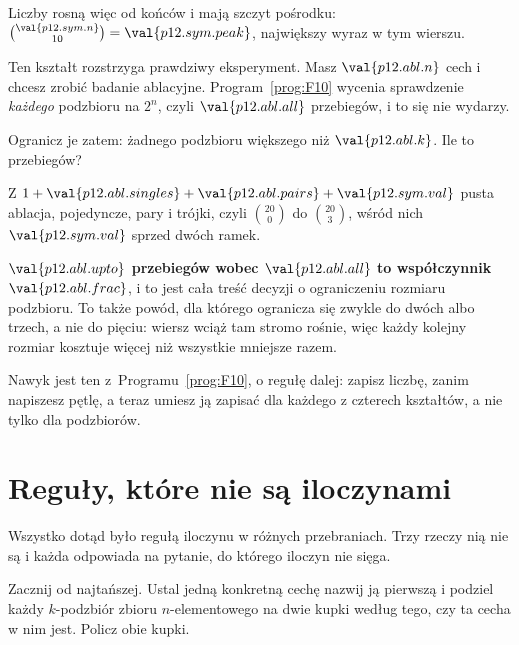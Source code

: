 \begin{fr}
Liczby rosną więc od końców i mają szczyt pośrodku:
$\binom{\val{p12.sym.n}}{10} = \val{p12.sym.peak}$, największy wyraz w tym
wierszu.

Ten kształt rozstrzyga prawdziwy eksperyment. Masz $\val{p12.abl.n}$ cech i
chcesz zrobić badanie ablacyjne. Program~\ref{prog:F10} wycenia sprawdzenie
\emph{każdego} podzbioru na $2^{n}$, czyli $\val{p12.abl.all}$ przebiegów, i
to się nie wydarzy.

Ogranicz je zatem: żadnego podzbioru większego niż $\val{p12.abl.k}$. Ile to
przebiegów?
\dotline
\nextframe
\end{fr}

\begin{fr}
Z $1 + \val{p12.abl.singles} + \val{p12.abl.pairs} + \val{p12.sym.val}$
\dash{} pusta ablacja, pojedyncze, pary i trójki, czyli
$\binom{20}{0}$ do $\binom{20}{3}$, wśród nich $\val{p12.sym.val}$ sprzed
dwóch ramek.

\textbf{$\val{p12.abl.upto}$ przebiegów wobec $\val{p12.abl.all}$ to
współczynnik $\val{p12.abl.frac}$}, i to jest cała treść decyzji o
ograniczeniu rozmiaru podzbioru. To także powód, dla którego ogranicza się
zwykle do dwóch albo trzech, a nie do pięciu: wiersz wciąż tam stromo rośnie,
więc każdy kolejny rozmiar kosztuje więcej niż wszystkie mniejsze razem.

Nawyk jest ten z~Programu~\ref{prog:F10}, o regułę dalej: zapisz liczbę, zanim
napiszesz pętlę, a teraz umiesz ją zapisać dla każdego z czterech kształtów, a
nie tylko dla podzbiorów.
\end{fr}

\section{Reguły, które nie są iloczynami}
\label{sec:P12-not-products}

\begin{fr}
Wszystko dotąd było regułą iloczynu w różnych przebraniach. Trzy rzeczy nią
nie są i każda odpowiada na pytanie, do którego iloczyn nie sięga.

Zacznij od najtańszej. Ustal jedną konkretną cechę \dash{} nazwij ją pierwszą
\dash{} i podziel każdy $k$-podzbiór zbioru $n$-elementowego na dwie kupki
według tego, czy ta cecha w nim jest. Policz obie kupki.
\nextframe
\end{fr}

